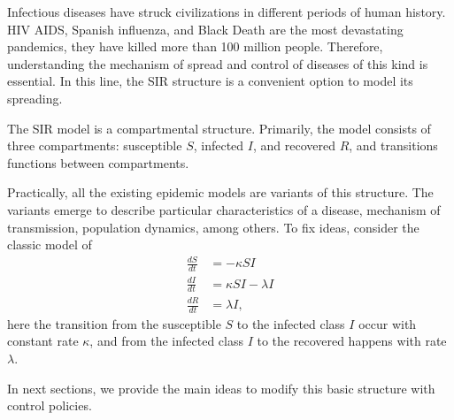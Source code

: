   Infectious diseases have struck civilizations in different periods of human 
history.  HIV AIDS, Spanish influenza, and Black Death are the most devastating
pandemics, they have killed more than 100 million people. Therefore,
understanding the mechanism of spread and control of diseases of this kind is
essential. In this line, the SIR structure is a convenient option to model its
spreading.

  The SIR model is a compartmental structure. Primarily, the model consists of 
three compartments: susceptible $S$, infected $I$, and recovered $R$, %
 and transitions functions between compartments.

  Practically, all the existing epidemic models are variants of this structure. 
The variants emerge to describe particular characteristics of a disease, 
mechanism of transmission, population dynamics, among others. 
To fix ideas, consider the classic model of 
\citet{Kermac}
\begin{equation}
  \label{eqn:sir_model}
  \begin{aligned}
    \frac{dS}{dt} & = - \kappa SI
      \\
    \frac{dI}{dt} & = \kappa SI - \lambda I
      \\
    \frac{dR}{dt} & = \lambda I,
  \end{aligned}
\end{equation}
here the transition from the susceptible $S$ to the infected class $I$ 
occur with constant rate $\kappa$, and from  the infected class $I$ to the 
recovered happens with rate $\lambda$.

In next sections, we provide the main ideas to modify this 
basic structure with control policies.